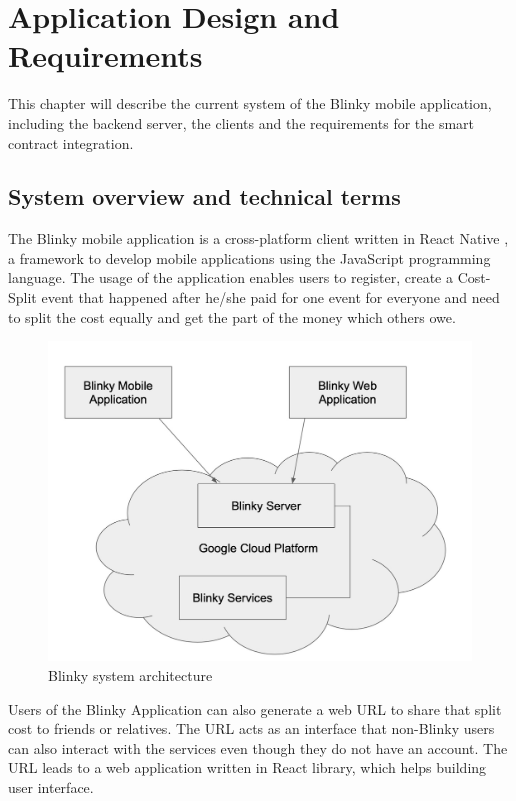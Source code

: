 \chapter{Application Design and Requirements}
\label{ch:ApplicationDesignAndReq}

This chapter will describe the current system of the Blinky mobile application, including the backend server, the clients  and the requirements for the smart contract integration.

\section{System overview and technical terms}

The Blinky mobile application is a cross-platform client written in React Native \citep{ReactNative}, a framework to develop mobile applications using the JavaScript programming language. The usage of the application enables users to register, create a Cost-Split event that happened after he/she paid for one event for everyone and need to split the cost equally and get the part of the money which others owe.

\begin{figure}
    \centering
    \includegraphics[width=\linewidth]{blinky_system_architecture.jpg}
    \caption{Blinky system architecture}
    \label{fig:blinky_system}
\end{figure}

Users of the Blinky Application can also generate a web URL to share that split cost to friends or relatives. The URL acts as an interface that non-Blinky users can also interact with the services even though they do not have an account. The URL leads to a web application written in React library, which helps building user interface.

